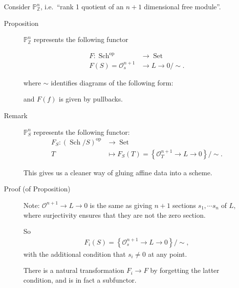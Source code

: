 Consider \({\mathbb{P}}^n_{\mathbb{Z}}\), i.e.~``rank 1 quotient of an
\(n+1\) dimensional free module''.

\begin{description}
\item[Proposition]
\({\mathbb{P}}^n_{\mathbb{Z}}\) represents the following functor

\begin{align*} F: {\operatorname{Sch}}^\operatorname{op}&\to {\operatorname{Set}}\\ F(S) =  {\mathcal{O}}_s^{n+1} &\to L \to 0 / \sim .\end{align*}

where \(\sim\) identifies diagrams of the following form:

\begin{center}
\end{center}

and \(F(f)\) is given by pullbacks.
\item[Remark]
\({\mathbb{P}}^n_S\) represents the following functor:
\begin{align*} F_S: ({\operatorname{Sch}}/S)^\operatorname{op}&\to {\operatorname{Set}}\\ T &\mapsto F_S(T) =  \left\{{ {\mathcal{O}}_T^{n+1} \to L \to 0}\right\} / \sim .\end{align*}

This gives us a cleaner way of gluing affine data into a scheme.
\item[Proof (of Proposition)]
Note: \({\mathcal{O}}^{n+1} \to L \to 0\) is the same as giving \(n+1\)
sections \(s_1, \cdots s_n\) of \(L\), where surjectivity ensures that
they are not the zero section.

So
\begin{align*}
F_i(S) = \left\{{{\mathcal{O}}_s^{n+1} \to L \to 0}\right\}/\sim
,\end{align*}
with the additional condition that \(s_i \neq 0\) at any point.

There is a natural transformation \(F_i \to F\) by forgetting the latter
condition, and is in fact a subfunctor.


\end{description}
